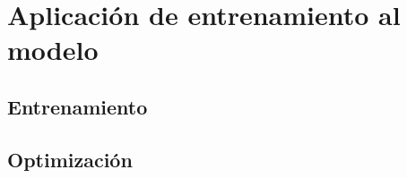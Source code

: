 \section{Aplicación de entrenamiento al modelo}\label{section:Aplicación de entrenamiento al modelo}

\subsection{Entrenamiento}\label{section:Aplicación de entrenamiento al modelo}
\subsection{Optimización}\label{section:Aplicación de entrenamiento al modelo}

